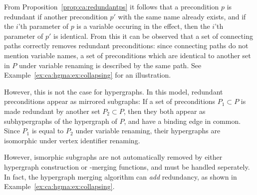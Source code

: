 \documentclass[../Master.tex]{subfiles}
\begin{document}
From Proposition~\ref{prop:ca:redundantps} it follows that a precondition $p$ is redundant if another precondition $p'$ with the same name already exists, and if the $i$'th parameter of $p$ is a variable occuring in the effect, then the $i$'th parameter of $p'$ is identical. From this it can be observed that a set of connecting paths correctly removes redundant preconditions: since connecting paths do not mention variable names, a set of preconditions which are identical to another set in $P$ under variable renaming is described by the same path. See Example~\ref{ex:ca:hgma:ex:collapsing} for an illustration.

However, this is not the case for hypergraphs. In this model, redundant preconditions appear as mirrored subgraphs: If a set of preconditions $P_1 \subset P$ is made redundant by another set $P_2 \subset P$, then they both appear as subhypergraphs of the hypergraph of $P$, and have a binding edge in common. Since $P_1$ is equal to $P_2$ under variable renaming, their hypergraphs are isomorphic under vertex identifier renaming. 

However, ismorphic subgraphs are not automatically removed by either hypergraph construction or -merging functions, and must be handled seperately. In fact, the hypergraph merging algorithm can \textit{add} redundancy, as shown in Example~\ref{ex:ca:hgma:ex:collapsing}.
\end{document}
